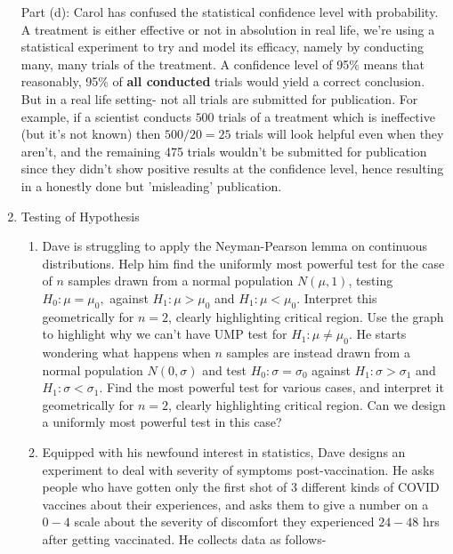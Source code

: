 \documentclass[12pt, oneside]{article}
\begin{document}
\begin{enumerate}
Part (d): Carol has confused the statistical confidence level with probability. A treatment is either effective or not in absolution in real life, we're using a statistical experiment to try and model its efficacy, namely by conducting many, many trials of the treatment. A confidence level of 95\% means that reasonably, 95\% of \textbf{all conducted} trials would yield a correct conclusion. But in a real life setting- not all trials are submitted for publication. For example, if a scientist conducts $500$ trials of a treatment which is ineffective (but it's not known) then $500/20 = 25$ trials will look helpful even when they aren't, and the remaining 475 trials wouldn't be submitted for publication since they didn't show positive results at the confidence level, hence resulting in a honestly done but 'misleading' publication. 



\item Testing of Hypothesis 
\begin{enumerate}
    \item Dave is struggling to apply the Neyman-Pearson lemma on continuous distributions. Help him find the uniformly most powerful test for the case of $n$ samples drawn from a normal population $N(\mu,1)$, testing $H_0:\mu = \mu_0,$ against $H_1: \mu > \mu_0$ and $H_1: \mu < \mu_0$. Interpret this geometrically for $n=2$, clearly highlighting critical region. Use the graph to highlight why we can't have UMP test for $H_1 : \mu \neq \mu_0$. He starts wondering what happens when $n$ samples are instead drawn from a normal population $N(0,\sigma)$ and test $H_0: \sigma = \sigma_0$ against $H_1: \sigma > \sigma_1$ and $H_1: \sigma < \sigma_1$. Find the most powerful test for various cases, and interpret it geometrically for $n=2$, clearly highlighting critical region. Can we design a uniformly most powerful test in this case?

    \item Equipped with his newfound interest in statistics, Dave designs an experiment to deal with severity of symptoms post-vaccination. He asks people who have gotten only the first shot of 3 different kinds of COVID vaccines about their experiences, and asks them to give a number on a $0-4$ scale about the severity of discomfort they experienced $24-48$ hrs after getting vaccinated. He collects data as follows- 


\end{enumerate}
\end{enumerate}
\end{document}
